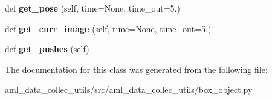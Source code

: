 \begin{DoxyCompactItemize}
def {\bfseries get\+\_\+pose} (self, time=None, time\+\_\+out=5.)
\item 
\hypertarget{classaml__data__collec__utils_1_1box__object_1_1_box_object_af55d698d891e6e6c83dea2c1ecf41d8a}{}\label{classaml__data__collec__utils_1_1box__object_1_1_box_object_af55d698d891e6e6c83dea2c1ecf41d8a} 
def {\bfseries get\+\_\+curr\+\_\+image} (self, time=None, time\+\_\+out=5.)
\item 
\hypertarget{classaml__data__collec__utils_1_1box__object_1_1_box_object_af47936709c1861a9b5caa72a83c1777a}{}\label{classaml__data__collec__utils_1_1box__object_1_1_box_object_af47936709c1861a9b5caa72a83c1777a} 
def {\bfseries get\+\_\+pushes} (self)
\end{DoxyCompactItemize}


The documentation for this class was generated from the following file\+:\begin{DoxyCompactItemize}
\item 
aml\+\_\+data\+\_\+collec\+\_\+utils/src/aml\+\_\+data\+\_\+collec\+\_\+utils/box\+\_\+object.\+py\end{DoxyCompactItemize}
